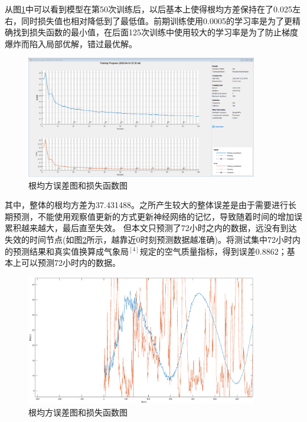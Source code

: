 \documentclass[UTF8]{ctexart}
\begin{document}
从图\ref{res2}中可以看到模型在第50次训练后，以后基本上使得根均方差保持在了0.025左右，同时损失值也相对降低到了最低值。前期训练使用0.0005的学习率是为了更精确找到损失函数的最小值，在后面125次训练中使用较大的学习率是为了防止梯度爆炸而陷入局部优解，错过最优解。
\begin{figure}[H] %
    \centering %
    \includegraphics[width=0.9\textwidth]{./picture/TrainingProgress.png} %
    \caption{根均方误差图和损失函数图}
    \label{res2} 
\end{figure}

其中，整体的根均方差为37.431488。之所产生较大的整体误差是由于需要进行长期预测，不能使用观察值更新的方式更新神经网络的记忆，导致随着时间的增加误累积越来越大，最后直至失效。
但本文只预测了72小时之内的数据，远没有到达失效的时间节点(如图\ref{untide2}所示，越靠近0时刻预测数据越准确)。将测试集中72小时内的预测结果和真实值换算成气象局$^{[4]}$规定的空气质量指标，得到误差0.8862；基本上可以预测72小时内的数据。
\begin{figure}[H] %
    \centering %
    \includegraphics[width=0.9\textwidth]{./picture/untide2.eps} %
    \caption{根均方误差图和损失函数图}
    \label{untide2} 
\end{figure}
\end{document}

